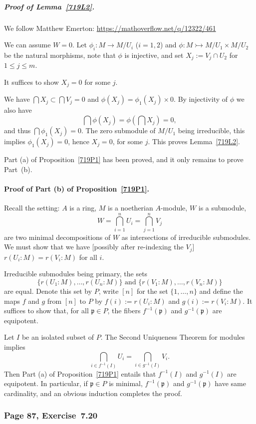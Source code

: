 \documentclass[12pt,letterpaper]{article}%
\newcommand{\mf}{\mathfrak}
\newcommand{\ppp}{\mf p}
\newcommand{\mono}{\rightarrowtail}
\begin{document}
\subparagraph{Proof of Lemma~\ref{719L2}.}%
We follow Matthew Emerton: \href{https://mathoverflow.net/q/12322/461}{https://mathoverflow.net/q/12322/461}

We can assume $W=0$. Let $\phi_i:M\to M/U_i$ ($i=1,2$) and $\phi:M\mono M/U_1\times M/U_2$ be the natural morphisms, note that $\phi$ is injective, and set $X_j:=V_j\cap U_2$ for $1\le j\le m$. 

It suffices to show $X_j=0$ for some $j$.

We have $\bigcap X_j\subset\bigcap V_j=0$ and $\phi(X_j)=\phi_1(X_j)\times0$. By injectivity of $\phi$ we also have 
$$
\bigcap\phi(X_j)=\phi\left(\bigcap X_j\right)=0,
$$ 
and thus $\bigcap\phi_1(X_j)=0$. The zero submodule of $M/U_1$ being ir\-re\-ducible, this implies $\phi_1(X_j)=0$, hence $X_j=0$, for some $j$. This proves Lemma~\ref{719L2}.

Part (a) of Proposition~\ref{719P1} has been proved, and it only remains to prove Part~(b).

\paragraph{Proof of Part (b) of Proposition~\ref{719P1}.}%

Recall the setting: $A$ is a ring, $M$ is a noetherian $A$-module, $W$ is a submodule, 
$$
W=\bigcap_{i=1}^nU_i=\bigcap_{j=1}^nV_j
$$ 
are two minimal decompositions of $W$ as intersections of irreducible submodules. We must show that we have [possibly after re-indexing the $V_j$] $r(U_i:M)=r(V_i:M)$ for all $i$.

Irreducible submodules being primary, the sets 
$$
\{r(U_1:M),\dots,r(U_n:M)\}\text{ and }\{r(V_1:M),\dots,r(V_n:M)\}
$$ 
are equal. Denote this set by $P$, write $[n]$ for the set $\{1,\dots,n\}$ and define the maps $f$ and $g$ from $[n]$ to $P$ by $f(i):=r(U_i:M)$ and $g(i):=r(V_i:M)$. It suffices to show that, for all $\ppp\in P$, the fibers $f^{-1}(\ppp)$ and $g^{-1}(\ppp)$ are equipotent. 

Let $I$ be an isolated subset of $P$. The Second Uniqueness Theorem for modules implies 
$$
\bigcap_{i\in f^{-1}(I)}U_i=\bigcap_{i\in g^{-1}(I)}V_i.
$$ 
Then Part (a) of Proposition~\ref{719P1} entails that $f^{-1}(I)$ and $g^{-1}(I)$ are equipotent. In particular, if $\ppp\in P$ is minimal, $f^{-1}(\ppp)$ and $g^{-1}(\ppp)$ have same cardinality, and an obvious induction completes the proof. 

\subsubsection{Page 87, Exercise~7.20}\label{ex7.20}%
\end{document}
